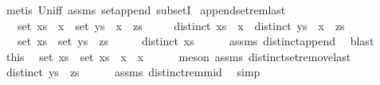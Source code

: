 \begin{isabellebody}
%
\isatagproof
{}\isamarkupfalse%
\ {\isacharparenleft}metis\ Un{\isacharunderscore}iff\ assms\ set{\isacharunderscore}append\ subsetI{\isacharparenright}{\isacharplus}%
\endisatagproof
{\isafoldproof}%
%
\isadelimproof
\isanewline
%
\endisadelimproof
\isanewline
{}\isamarkupfalse%
\ append{\isacharunderscore}set{\isacharunderscore}rem{\isacharunderscore}last{\isacharcolon}\isanewline
\ \ \ {\isachardoublequoteopen}set\ {\isacharparenleft}xs\ {\isacharat}\ {\isacharbrackleft}x{\isacharbrackright}{\isacharparenright}\ {\isacharequal}\ set\ {\isacharparenleft}ys\ {\isacharat}\ {\isacharbrackleft}x{\isacharbrackright}\ {\isacharat}\ zs{\isacharparenright}{\isachardoublequoteclose}\isanewline
\ \ \ \ \ {\isachardoublequoteopen}distinct\ {\isacharparenleft}xs\ {\isacharat}\ {\isacharbrackleft}x{\isacharbrackright}{\isacharparenright}{\isachardoublequoteclose}\ \ {\isachardoublequoteopen}distinct\ {\isacharparenleft}ys\ {\isacharat}\ {\isacharbrackleft}x{\isacharbrackright}\ {\isacharat}\ zs{\isacharparenright}{\isachardoublequoteclose}\isanewline
\ \ \ {\isachardoublequoteopen}set\ xs\ {\isacharequal}\ set\ {\isacharparenleft}ys\ {\isacharat}\ zs{\isacharparenright}{\isachardoublequoteclose}\isanewline
%
\isadelimproof
%
\endisadelimproof
%
\isatagproof
{}\isamarkupfalse%
\ {\isacharminus}\isanewline
\ \ \isamarkupfalse%
\ {\isachardoublequoteopen}distinct\ xs{\isachardoublequoteclose}\isanewline
\ \ \ \ \isamarkupfalse%
\ assms\ distinct{\isacharunderscore}append\ \isamarkupfalse%
\ blast\isanewline
\ \ \isamarkupfalse%
\ \isamarkupfalse%
\ this\ \isamarkupfalse%
\ {\isachardoublequoteopen}set\ xs\ {\isacharequal}\ set\ {\isacharparenleft}xs\ {\isacharat}\ {\isacharbrackleft}x{\isacharbrackright}{\isacharparenright}\ {\isacharminus}\ {\isacharbraceleft}x{\isacharbraceright}{\isachardoublequoteclose}\isanewline
\ \ \ \ \isamarkupfalse%
\ {\isacharparenleft}meson\ assms\ distinct{\isacharunderscore}set{\isacharunderscore}remove{\isacharunderscore}last{\isacharparenright}\isanewline
\ \ \isamarkupfalse%
\ \isamarkupfalse%
\ {\isachardoublequoteopen}distinct\ {\isacharparenleft}ys\ {\isacharat}\ zs{\isacharparenright}{\isachardoublequoteclose}\isanewline
\ \ \ \ \isamarkupfalse%
\ assms\ distinct{\isacharunderscore}rem{\isacharunderscore}mid\ \isamarkupfalse%
\ simp\isanewline

\end{isabellebody}
